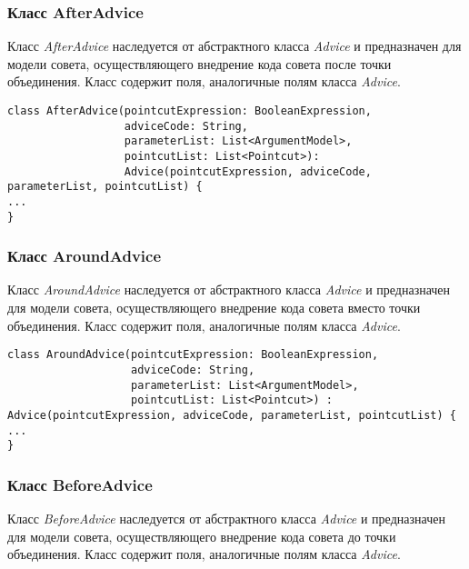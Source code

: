\subsubsection{Класс AfterAdvice}
\label{ssub:AfterAdvice}
Класс \textit{AfterAdvice} наследуется от абстрактного класса \textit{Advice} и
предназначен для модели совета, осуществляющего внедрение кода совета после
точки объединения.
Класс содержит поля, аналогичные полям класса \textit{Advice}.

\begin{lstlisting}[style={java}, label={lst:AfterAdvice},
  caption={Класс AfterAdvice}]
class AfterAdvice(pointcutExpression: BooleanExpression,
                  adviceCode: String,
                  parameterList: List<ArgumentModel>,
                  pointcutList: List<Pointcut>):
                  Advice(pointcutExpression, adviceCode, parameterList, pointcutList) {
...
}
\end{lstlisting}
\subsubsection{Класс AroundAdvice}
\label{ssub:AroundAdvice}
Класс \textit{AroundAdvice} наследуется от абстрактного класса \textit{Advice} и
предназначен для модели совета, осуществляющего внедрение кода совета вместо
точки объединения.
Класс содержит поля, аналогичные полям класса \textit{Advice}.

\begin{lstlisting}[style={java}, label={lst:AroundAdvice},
  caption={Класс AroundAdvice}]
class AroundAdvice(pointcutExpression: BooleanExpression,
                   adviceCode: String,
                   parameterList: List<ArgumentModel>,
                   pointcutList: List<Pointcut>) : Advice(pointcutExpression, adviceCode, parameterList, pointcutList) {
...
}
\end{lstlisting}
\subsubsection{Класс BeforeAdvice}
\label{ssub:BeforeAdvice}
Класс \textit{BeforeAdvice} наследуется от абстрактного класса \textit{Advice} и
предназначен для модели совета, осуществляющего внедрение кода совета до
точки объединения.
Класс содержит поля, аналогичные полям класса \textit{Advice}.

